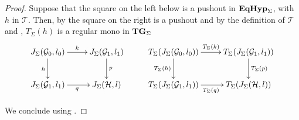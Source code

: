 \documentclass[a4paper,UKenglish,cleveref,pdftex,amsthm,thm-restate,numberwithinsect]{cas-sc}
\theoremstyle{plain}
\theoremstyle{definition}
\newcommand{\catname}[1]{\textbf{\textup{#1}}}
\newcommand{\EqHyp}{\catname{EqHyp}} %
\newcommand{\tg}[0]{\catname{TG}_{\Sigma}}
\begin{document}
\po*
\begin{proof}\label{proof:tade}
	Suppose that the square on the left below is a pushout in $\EqHyp_\Sigma$, with $h$ in $\mathcal{T}$. Then, by  the square on the right is a pushout and by the definition of $\mathcal{T}$ and , $T_\Sigma(h)$ is a regular mono in $\tg$
	\[\xymatrix{J_\Sigma(\mathcal{G}_0, l_0) \ar[r]^{k} \ar[d]_{h}& J_\Sigma(\mathcal{G}_1, l_1) \ar[d]^{p} &T_\Sigma (J_\Sigma(\mathcal{G}_0, l_0)) \ar[r]^{T_{\Sigma}(k)} \ar[d]_{T_{\Sigma}(h)}& T_\Sigma (J_\Sigma(\mathcal{G}_1, l_1)) \ar[d]^{T_\Sigma(p)}\\
J_\Sigma(\mathcal{G}_1, l_1) \ar[r]_{q}& J_\Sigma(\mathcal{H}, l) & T_\Sigma(J_\Sigma(\mathcal{G}_1, l_1)) \ar[r]_{T_\Sigma(q)}& T_\Sigma(J_\Sigma(\mathcal{H}, l))}\]
	
	We conclude using .
\end{proof}
\end{document}
